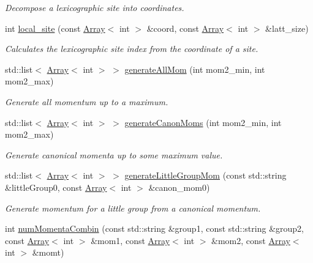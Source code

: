 \begin{DoxyCompactItemize}
\begin{DoxyCompactList}\small\item\em Decompose a lexicographic site into coordinates. \end{DoxyCompactList}\item 
int \mbox{\hyperlink{namespaceHadron_ab96485b602362d63c3326d4326e3733d}{local\+\_\+site}} (const \mbox{\hyperlink{classXMLArray_1_1Array}{Array}}$<$ int $>$ \&coord, const \mbox{\hyperlink{classXMLArray_1_1Array}{Array}}$<$ int $>$ \&latt\+\_\+size)
\begin{DoxyCompactList}\small\item\em Calculates the lexicographic site index from the coordinate of a site. \end{DoxyCompactList}\item 
std\+::list$<$ \mbox{\hyperlink{classXMLArray_1_1Array}{Array}}$<$ int $>$ $>$ \mbox{\hyperlink{namespaceHadron_aa0ad60c011c7668c5389ce9286b3c8dd}{generate\+All\+Mom}} (int mom2\+\_\+min, int mom2\+\_\+max)
\begin{DoxyCompactList}\small\item\em Generate all momentum up to a maximum. \end{DoxyCompactList}\item 
std\+::list$<$ \mbox{\hyperlink{classXMLArray_1_1Array}{Array}}$<$ int $>$ $>$ \mbox{\hyperlink{namespaceHadron_af42e0a1c54e10b67abac83c56c67b40e}{generate\+Canon\+Moms}} (int mom2\+\_\+min, int mom2\+\_\+max)
\begin{DoxyCompactList}\small\item\em Generate canonical momenta up to some maximum value. \end{DoxyCompactList}\item 
std\+::list$<$ \mbox{\hyperlink{classXMLArray_1_1Array}{Array}}$<$ int $>$ $>$ \mbox{\hyperlink{namespaceHadron_a12d4f9d40cac2700ebb7a7420f20987b}{generate\+Little\+Group\+Mom}} (const std\+::string \&little\+Group0, const \mbox{\hyperlink{classXMLArray_1_1Array}{Array}}$<$ int $>$ \&canon\+\_\+mom0)
\begin{DoxyCompactList}\small\item\em Generate momentum for a little group from a canonical momentum. \end{DoxyCompactList}\item 
int \mbox{\hyperlink{namespaceHadron_afc213211f9c79372b449aac381596d1c}{num\+Momenta\+Combin}} (const std\+::string \&group1, const std\+::string \&group2, const \mbox{\hyperlink{classXMLArray_1_1Array}{Array}}$<$ int $>$ \&mom1, const \mbox{\hyperlink{classXMLArray_1_1Array}{Array}}$<$ int $>$ \&mom2, const \mbox{\hyperlink{classXMLArray_1_1Array}{Array}}$<$ int $>$ \&momt)

\end{DoxyCompactItemize}
